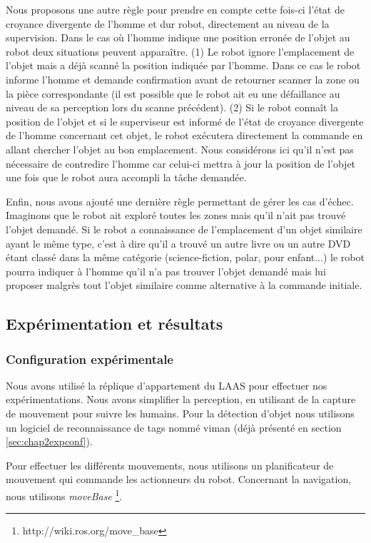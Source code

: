 \documentclass[a4paper,11pt,twoside]{StyleThese}
\begin{document}
Nous proposons une autre règle pour prendre en compte cette fois-ci l'état de croyance divergente de l'homme et dur robot, directement au niveau de la supervision.
Dans le cas où l'homme indique une position erronée de l'objet au robot deux situations peuvent apparaître. (1) Le robot ignore l'emplacement de l'objet mais a déjà scanné la position indiquée par l'homme. Dans ce cas le robot informe l'homme et demande confirmation avant de retourner scanner la zone ou la pièce correspondante (il est possible que le robot ait eu une défaillance au niveau de sa perception lors du scanne précédent). (2) Si le robot connaît la position de l'objet et si le superviseur est informé de l'état de croyance divergente de l'homme concernant cet objet, le robot exécutera directement la commande en allant chercher l'objet au bon emplacement. Nous considérons ici qu'il n'est pas nécessaire de contredire l'homme car celui-ci mettra à jour la position de l'objet une fois que le robot aura accompli la tâche demandée.


Enfin, nous avons ajouté une dernière règle permettant de gérer les cas d'échec.
Imaginons que le robot ait exploré toutes les zones mais qu'il n'ait pas trouvé l'objet demandé. Si le robot a connaissance de l'emplacement d'un objet similaire ayant le même type, c'est à dire qu'il a trouvé un autre livre ou un autre DVD étant classé dans la même catégorie (science-fiction, polar, pour enfant...) le robot pourra indiquer à l'homme qu'il n'a pas trouver l'objet demandé mais lui proposer malgrès tout l'objet similaire comme alternative à la commande initiale.




\subsection{Expérimentation et résultats}

\subsubsection{Configuration expérimentale}
Nous avons utilisé la réplique d'appartement du LAAS pour effectuer nos expérimentations. Nous avons simplifier la perception, en utilisant de la capture de mouvement pour suivre les humains. Pour la détection d'objet nous utilisons un logiciel de reconnaissance de tags nommé viman (déjà présenté en section \ref{sec:chap2expconf}).


Pour effectuer les différents mouvements, nous utilisons un planificateur de mouvement\cite{Sisbot2008} qui commande les actionneurs du robot.
Concernant la navigation, nous utilisons \textit{moveBase} \footnote{http://wiki.ros.org/move\_base}.
\end{document}

